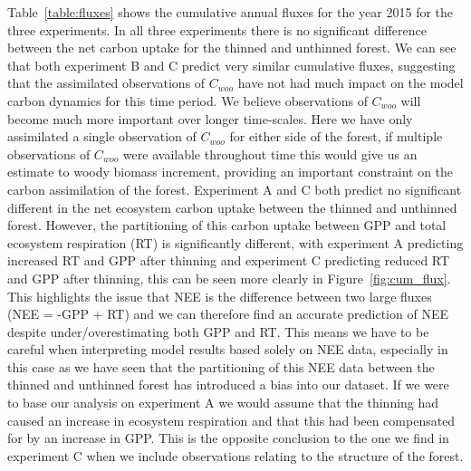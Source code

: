 \documentclass[draft,linenumbers]{agujournal}
\begin{document}
Table~\ref{table:fluxes} shows the cumulative annual fluxes for the year 2015 for the three experiments. In all three experiments there is no significant difference between the net carbon uptake for the thinned and unthinned forest. We can see that both experiment B and C predict very similar cumulative fluxes, suggesting that the assimilated observations of \(C_{woo}\) have not had much impact on the model carbon dynamics for this time period. We believe observations of \(C_{woo}\) will become much more important over longer time-scales. Here we have only assimilated a single observation of \(C_{woo}\) for either side of the forest, if multiple observations of \(C_{woo}\) were available throughout time this would give us an estimate to woody biomass increment, providing an important constraint on the carbon assimilation of the forest. Experiment A and C both predict no significant different in the net ecosystem carbon uptake between the thinned and unthinned forest. However, the partitioning of this carbon uptake between GPP and total ecosystem respiration (RT) is significantly different, with experiment A predicting increased RT and GPP after thinning and experiment C predicting reduced RT and GPP after thinning, this can be seen more clearly in Figure~\ref{fig:cum_flux}. This highlights the issue that NEE is the difference between two large fluxes (NEE = -GPP + RT) and we can therefore find an accurate prediction of NEE despite under/overestimating both GPP and RT. This means we have to be careful when interpreting model results based solely on NEE data, especially in this case as we have seen that the partitioning of this NEE data between the thinned and unthinned forest has introduced a bias into our dataset. If we were to base our analysis on experiment A we would assume that the thinning had caused an increase in ecosystem respiration and that this had been compensated for by an increase in GPP. This is the opposite conclusion to the one we find in experiment C when we include observations relating to the structure of the forest. 
\end{document}
